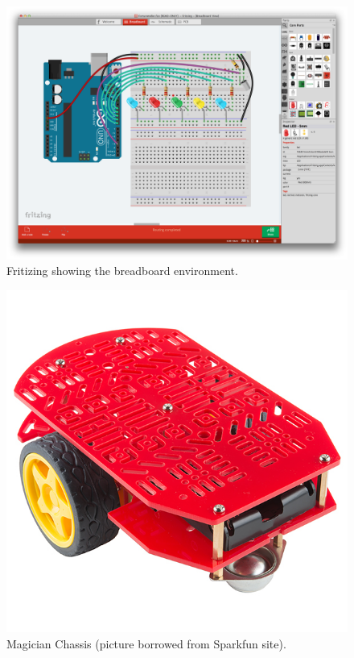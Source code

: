 \begin{figure}
\centering
\centering%
\includegraphics[height=.35\textwidth]{img/FritzingBreadBoard.png}
\caption{Fritizing showing the breadboard environment.}
\label{fig:breadboard}%
\end{figure}

\begin{figure}
\centering
\centering%
\includegraphics[height=.35\textwidth]{img/magician.jpg}
\caption{Magician Chassis (picture borrowed from Sparkfun site).}
\label{fig:mag}%
\end{figure}

